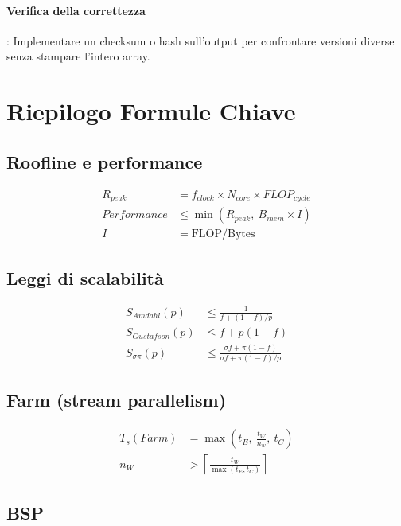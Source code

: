 \documentclass[11pt,a4paper]{article}
\theoremstyle{remark}
\begin{document}
\paragraph{Verifica della correttezza}:
Implementare un checksum o hash sull'output per confrontare versioni diverse senza stampare l'intero array.

\section{Riepilogo Formule Chiave}

\subsection{Roofline e performance}

\begin{align*}
  R_{peak} &= f_{clock} \times N_{core} \times FLOP_{cycle} \\
  Performance &\leq \min(R_{peak},\ B_{mem} \times I) \\
  I &= \text{FLOP} / \text{Bytes}
\end{align*}

\subsection{Leggi di scalabilità}

\begin{align*}
  S_{Amdahl}(p) &\leq \frac{1}{f + (1-f)/p} \\
  S_{Gustafson}(p) &\leq f + p(1-f) \\
  S_{\sigma\pi}(p) &\leq \frac{\sigma f + \pi(1-f)}{\sigma f + \pi(1-f)/p}
\end{align*}

\subsection{Farm (stream parallelism)}

\begin{align*}
  T_s(Farm) &= \max\!\left(t_E,\ \frac{t_W}{n_w},\ t_C\right) \\
  n_W &> \left\lceil \frac{t_W}{\max(t_E, t_C)} \right\rceil
\end{align*}

\subsection{BSP}
\end{document}
